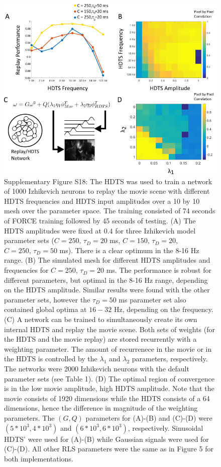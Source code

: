 \documentclass[11pt]{article} %
\begin{document}
\begin{figure}
\centering
\includegraphics[scale=0.9]{FFIGS19}
    \caption*{Supplementary Figure S18:  The HDTS was used to train a network of 1000 Izhikevich neurons to replay the movie scene with different HDTS frequencies and HDTS input amplitudes over a 10 by 10 mesh over the parameter space.    The training consisted of 74 seconds of FORCE training followed by 45 seconds of testing.  (A) The HDTS amplitudes were fixed at $0.4$ for three Izhikevich model parameter sets ($C= 250,\,\tau_D = 20$ ms, $C= 150,\,\tau_D = 20$, $C= 250,\, \tau_D = 50$ ms).  There is a clear optimum in the 8-16 Hz range.  (B) The simulated mesh for different HDTS amplitudes and frequencies for $C=250$, $\tau_D = 20$ ms.  The performance is robust for different parameters, but optimal in the 8-16 Hz range, depending on the HDTS amplitude.  Similar results were found with the other parameter sets, however the $\tau_D =50$ ms parameter set also contained global optima at $16-32$ Hz, depending on the frequency.    
 (C) A network can be trained to simultaneously create its own internal HDTS and replay the movie scene.  Both sets of weights (for the HDTS and the movie replay) are stored recurrently with a weighting parameter.  The amount of recurrenece in the movie or in the HDTS is controlled by the $\lambda_1$ and $\lambda_2$ parameters, respectively.    The networks were 2000 Izhikevich neurons with the default parameter sets (see Table 1).  (D) The optimal region of convergence is in the low movie amplitude, high HDTS amplitude.  Note that the movie consists of 1920 dimensions while the HDTS consists of a 64 dimensions, hence the difference in magnitude of the weighting parameters.  The $(G,Q)$ parameters for (A)-(B) and (C)-(D) were $(5*10^3,4*10^3)$ and  $(6*10^3,6*10^3)$, respectively.  Sinusoidal HDTS' were used for (A)-(B) while Gaussian signals were used for (C)-(D).  All other RLS parameters were the same as in Figure 5 for both implementations.    }
\end{figure}
\end{document}
